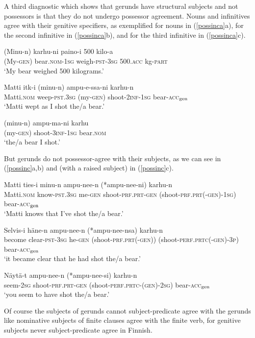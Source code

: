 \documentclass[output=paper,
modfonts
]{LSP/langsci}
\newcommand{\rfa}[2]{(\ref{#1}{#2})}
\def\trf#1{$_{\textrm{\scriptsize{#1}}}$}
\begin{document}
A third diagnostic which shows that gerunds have structural subjects and not possessors is that
they do not undergo possessor agreement.
Nouns and infinitives agree with their genitive specifiers, as exemplified for nouns in
\rfa{possinca}{a}, for the second infinitive in \rfa{possinca}{b}, and for the third infinitive
in \rfa{possinca}{c}.
\begin{exe}
\ex\label{possinca}
	\ea \gll (Minu-n)  karhu-ni paino-i 500 kilo-a \\
  		(My-\textsc{gen}) bear.\textsc{nom}-\textsc{1sg} weigh-\textsc{pst}-\textsc{3sg} 500.\textsc{acc} kg-\textsc{part} \\
 		\glt  `My bear weighed 500 kilograms.'

	\ex \gll Matti itk-i (minu-n) ampu-e-ssa-ni karhu-n 	\\
  		Matti.\textsc{nom} weep-\textsc{pst}.\textsc{3sg} (my-\textsc{gen}) shoot-\textsc{2inf}-\textsc{1sg} bear-\textsc{acc\trf{gen}}  \\
  		\glt `Matti wept as I shot the/a bear.'

	\ex \gll (minu-n) ampu-ma-ni karhu 	\\
  		(my-\textsc{gen}) shoot-\textsc{3inf}-\textsc{1sg} bear.\textsc{nom}  \\
  		\glt `the/a bear I shot.'
	\z
\end{exe}
But gerunds do not possessor-agree with their subjects, as we can see in \rfa{possinc}{a,b} and
(with a raised subject) in \rfa{possinc}{c}.  
\begin{exe}
\ex\label{possinc}
	\ea  \gll Matti ties-i minu-n ampu-nee-n (*ampu-nee-ni) karhu-n \\ 
		Matti.\textsc{nom} know-\textsc{pst}.\textsc{3sg} me-\textsc{gen} 
		shoot-\textsc{prf}.\textsc{prt}-\textsc{gen} (shoot-\textsc{prf}.\textsc{prt}(-\textsc{gen})-\textsc{1sg}) bear-\textsc{acc\trf{gen}}  \\ 
		\glt `Matti knows that I've shot the/a bear.'  

	\ex \gll Selvis-i häne-n ampu-nee-n (*ampu-nee-nsa) karhu-n\\
		{become clear-\textsc{pst}-\textsc{3sg}} he-\textsc{gen}
 		 (shoot-\textsc{prf}.\textsc{prt}(-\textsc{gen})) (shoot-\textsc{perf}.\textsc{prtc}(-\textsc{gen})-\textsc{3p})
 		 bear-\textsc{acc\trf{gen}}  \\ 
  		\glt `it became clear that he had shot the/a bear.'

	\ex   \gll Näytä-t ampu-nee-n (*ampu-nee-si) karhu-n\\
  		seem-\textsc{2sg} shoot-\textsc{prf}.\textsc{prt}-\textsc{gen}
 		 (shoot-\textsc{perf}.\textsc{prtc}-(\textsc{gen})-\textsc{2sg})  bear-\textsc{acc\trf{gen}}   \\
  		\glt `you seem to have shot the/a bear.'
	\z
\end{exe}
Of course the subjects of gerunds cannot subject-predicate agree with the gerunds like
nominative subjects of finite clauses agree with the finite verb, for genitive subjects never
subject-predicate agree in Finnish.
\end{document}
